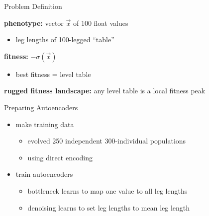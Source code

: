 
\begin{frame}{Problem Definition}

\textbf{phenotype:} vector $\vec{x}$ of 100 float values
\begin{itemize}
\item leg lengths of 100-legged ``table''
\end{itemize}

\vspace{2ex}
\pause

\textbf{fitness:} $-\sigma(\vec{x})$
\begin{itemize}
\item best fitness = level table
\end{itemize}

\vspace{2ex}
\pause

\textbf{rugged fitness landscape:}
any level table is a local fitness peak

\end{frame}

\begin{frame}{Preparing Autoencoders}

\Large

\begin{itemize}[<+->]
\item make training data
\pause
\begin{itemize}[<+->]
\item evolved 250 independent 300-individual populations
\item using direct encoding
\end{itemize}
\vspace{1ex}
\item train autoencoders
\pause
\begin{itemize}[<+->]
\item bottleneck learns to map one value to all leg lengths
\item denoising learns to set leg lengths to mean leg length
\end{itemize}
\end{itemize}

\end{frame}

